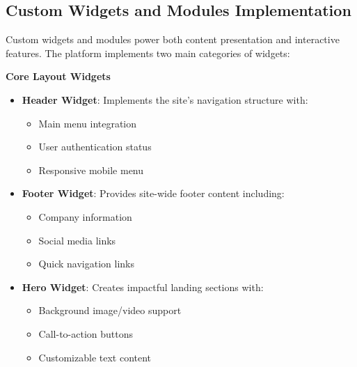 \subsection{Custom Widgets and Modules Implementation}

Custom widgets and modules power both content presentation and interactive features. The platform implements two main categories of widgets:

\textbf{Core Layout Widgets}
\begin{itemize}
    \item \textbf{Header Widget}: Implements the site's navigation structure with:
    \begin{itemize}
        \item Main menu integration
        \item User authentication status
        \item Responsive mobile menu
    \end{itemize}
    
    \item \textbf{Footer Widget}: Provides site-wide footer content including:
    \begin{itemize}
        \item Company information
        \item Social media links
        \item Quick navigation links
    \end{itemize}
    
    \item \textbf{Hero Widget}: Creates impactful landing sections with:
    \begin{itemize}
        \item Background image/video support
        \item Call-to-action buttons
        \item Customizable text content
    \end{itemize}
\end{itemize}

